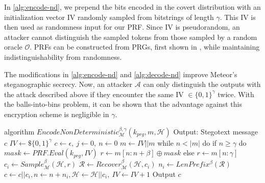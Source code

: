 In \autoref{alg:encode-nd}, we prepend the bits encoded in the covert distribution with an initialization vector IV randomly sampled from bitstrings of length $\gamma$.
This IV is then used as randomness input for our PRF.
Since IV is pseudorandom, an attacker cannot distinguish the sampled tokens from those sampled by a random oracle $\mathcal{O}$.
PRFs can be constructed from PRGs, first shown in \cite{PRF1986}, while maintaining indistinguishability from randomness.

The modifications in \autoref{alg:encode-nd} and \autoref{alg:decode-nd} improve Meteor's steganographic secrecy.
Now, an attacker $\mathcal{A}$ can only distinguish the outputs with the attack described above if they encounter the same IV $\in \{ 0,1\}^\gamma$ twice.
With the balls-into-bins problem, it can be shown that the advantage against this encryption scheme is negligible in $\gamma$.

\begin{Pseudocode}[float, caption={
Meteor EncodeNonDeterministic Algorithm.
This algorithm differs from the original Encode algorithm by sampling a random IV before encoding.
That IV is later used as randomness in a PRF used to generated the random masked.
The IV is incremented after each iteration of the encoding process.
The first $\gamma$ bits of the hiddentext are the IV. 
The introduction of an IV does not negatively affect secrecy, since IV is indistinguishable from randomness.}, label={alg:encode-nd}]
algorithm $EncodeNonDeterministic_{\mathcal{M}}^{\beta,\gamma}(k_{prg}, m, \mathcal{H})$
	Output: Stegotext message $c$
	$IV \leftarrow\$ \{0,1\}^\gamma$
	$c \leftarrow \epsilon,~ j \leftarrow 0,~ n \leftarrow 0$
	$m \leftarrow IV || m$
	while $n < |m|$ do
		if $n \geq \gamma$ do
			$mask \leftarrow PRF.Eval(k_{prg}, IV)$
			$r \leftarrow m[n:n+\beta] \oplus mask$
		else
			$r \leftarrow m[n:\gamma]$
		$c_i \leftarrow Sample_{\mathcal{M}}^\beta(\mathcal{H}, r)$
		$\mathcal{R} \leftarrow Recover_{\mathcal{M}}^\beta(\mathcal{H}, c_i)$
		$n_i \leftarrow LenPrefix^\beta(\mathcal{R})$
		$c \leftarrow c || c_i, n \leftarrow n+n_i, \mathcal{H} \leftarrow \mathcal{H}||c_i,~ IV \leftarrow IV+1$
	Output $c$
\end{Pseudocode}

